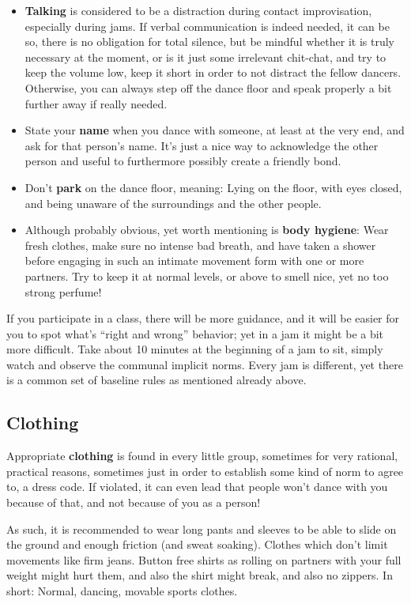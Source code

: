 \begin{itemize}
    \item \textbf{Talking} is considered to be a distraction during contact improvisation, especially during jams.
    If verbal communication is indeed needed, it can be so, there is no obligation for total silence, but be mindful whether it is truly necessary at the moment, or is it just some irrelevant chit-chat, and try to keep the volume low, keep it short in order to not distract the fellow dancers.
    Otherwise, you can always step off the dance floor and speak properly a bit further away if really needed.
    \item State your \textbf{name} when you dance with someone, at least at the very end, and ask for that person's name.
    It's just a nice way to acknowledge the other person and useful to furthermore possibly create a friendly bond.
    \item Don't \textbf{park} on the dance floor, meaning: Lying on the floor, with eyes closed, and being unaware of the surroundings and the other people.
    \item Although probably obvious, yet worth mentioning is \textbf{body hygiene}: Wear fresh clothes, make sure no intense bad breath, and have taken a shower before engaging in such an intimate movement form with one or more partners.
    Try to keep it at normal levels, or above to smell nice, yet no too strong perfume!
\end{itemize}

If you participate in a class, there will be more guidance, and it will be easier for you to spot what's ``right and wrong'' behavior; yet in a jam it might be a bit more difficult.
Take about 10 minutes at the beginning of a jam to sit, simply watch and observe the communal implicit norms.
Every jam is different, yet there is a common set of baseline rules as mentioned already above.

\subsection{Clothing}\label{subsec:clothing}

Appropriate \textbf{clothing} is found in every little group, sometimes for very rational, practical reasons, sometimes just in order to establish some kind of norm to agree to, a dress code.
If violated, it can even lead that people won't dance with you because of that, and not because of you as a person!

As such, it is recommended to wear long pants and sleeves to be able to slide on the ground and enough friction (and sweat soaking).
Clothes which don't limit movements like firm jeans.
Button free shirts as rolling on partners with your full weight might hurt them, and also the shirt might break, and also no zippers.
In short: Normal, dancing, movable sports clothes.

